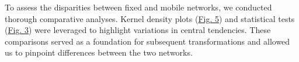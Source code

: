 \documentclass[
  letterpaper,
  DIV=11,
  numbers=noendperiod,
  oneside]{scrartcl}
\begin{document}
To assess the disparities between fixed and mobile networks, we
conducted thorough comparative analyses. Kernel density plots
(\protect\hyperlink{fig-kdeplots}{Fig. 5}) and statistical tests
(\protect\hyperlink{fig-stats}{Fig. 3}) were leveraged to highlight
variations in central tendencies. These comparisons served as a
foundation for subsequent transformations and allowed us to pinpoint
differences between the two networks.

\begin{figure}

\begin{minipage}[t]{0.50\linewidth}

{\centering 


}

\end{minipage}%
%
\begin{minipage}[t]{0.50\linewidth}

{\centering 

}
\end{minipage}
\end{figure}
\end{document}
